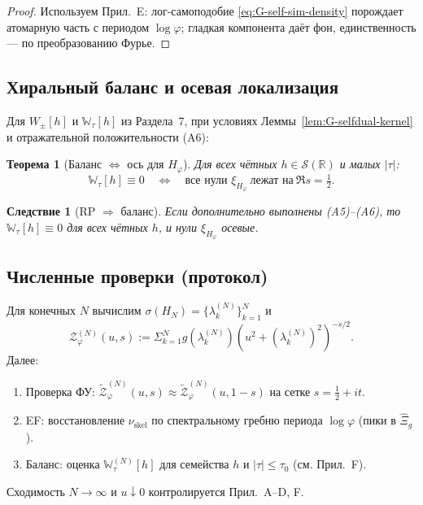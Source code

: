 \documentclass{article}
\numberwithin{equation}{section}
\theoremstyle{plain}
\newtheorem{theorem}{Теорема}
\newtheorem{corollary}{Следствие}
\theoremstyle{definition}
\theoremstyle{remark}
\def\Rightarrow{⇒}%
\def\infty{∞}\def\partial{∂}\def\sum{Σ}\def\int{∫}%
\begin{document}
\begin{proof}
Используем Прил.~\textup{E}: лог-самоподобие \eqref{eq:G-self-sim-density} порождает атомарную часть с периодом \(\log\varphi\); гладкая компонента даёт фон, единственность — по преобразованию Фурье.
\end{proof}

\subsection*{Хиральный баланс и осевая локализация}

Для \(W_\pm[h]\) и \(\mathbb W_\tau[h]\) из Раздела~7, при условиях Леммы~\ref{lem:G-selfdual-kernel} и отражательной положительности (A6):

\begin{theorem}[Баланс \(\Longleftrightarrow\) ось для \(H_\varphi\)]\label{thm:G-balance}
Для всех чётных \(h\in\mathcal S(\mathbb R)\) и малых \(|\tau|\):
\begin{equation}\label{eq:G-balance-axis}
\mathbb W_\tau[h]\equiv 0
\quad\Longleftrightarrow\quad
\text{все нули }\xi_{H_\varphi}\ \text{лежат на}\ \Re s=\tfrac12.
\end{equation}
\end{theorem}

\begin{corollary}[RP \(\Rightarrow\) баланс]
Если дополнительно выполнены (A5)–(A6), то \(\mathbb W_\tau[h]\equiv0\) для всех чётных \(h\), и нули \(\xi_{H_\varphi}\) осевые.
\end{corollary}

\subsection*{Численные проверки (протокол)}

Для конечных \(N\) вычислим \(\sigma(H_N)=\{\lambda_k^{(N)}\}_{k=1}^N\) и
\begin{equation}\label{eq:G-num-Z}
\mathcal Z_\varphi^{(N)}(u,s)
:=\sum_{k=1}^N g(\lambda_k^{(N)})(u^2+(\lambda_k^{(N)})^2)^{-s/2}.
\end{equation}
Далее:
\begin{enumerate}
\item Проверка ФУ: \(\widetilde{\mathcal Z}_\varphi^{(N)}(u,s)\approx \widetilde{\mathcal Z}_\varphi^{(N)}(u,1-s)\) на сетке \(s=\tfrac12+it\).
\item EF: восстановление \(\nu_{\mathrm{skel}}\) по спектральному гребню периода \(\log\varphi\) (пики в \(\widehat{\Xi}_g\)).
\item Баланс: оценка \(\mathbb W_\tau^{(N)}[h]\) для семейства \(h\) и \(|\tau|\le\tau_0\) (см. Прил.~\textup{F}).
\end{enumerate}
Сходимость \(N\to\infty\) и \(u\downarrow0\) контролируется Прил.~\textup{A}–\textup{D}, \textup{F}.
\end{document}
